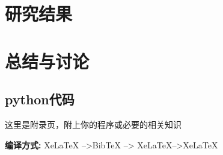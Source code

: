 \documentclass[AutoFakeBold]{fduthesis}
\begin{document}
\chapter{研究结果}

\chapter{总结与讨论}

\backmatter


\printbib




\Appendix
\section{python代码}
\label{sec:code}


这里是附录页，附上你的程序或必要的相关知识\cite{partl2016}

{\bfseries 编译方式:} XeLaTeX -->BibTeX --> XeLaTeX-->XeLaTeX
\end{document}
